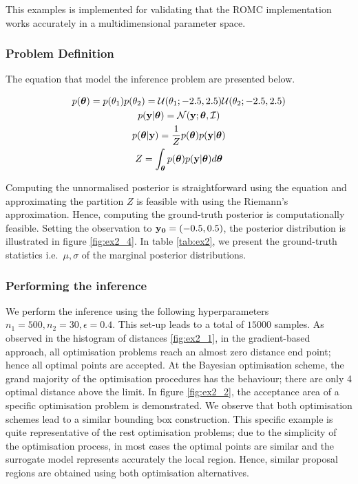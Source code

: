 This examples is implemented for validating that the ROMC
implementation works accurately in a multidimensional parameter
space.

\subsubsection*{Problem Definition}

The equation that model the inference problem are presented below.

\begin{gather}
  p(\boldsymbol{\theta}) = p(\theta_1)p(\theta_2)
  = \mathcal{U}(\theta_1; -2.5, 2.5) \mathcal{U}(\theta_2; -2.5, 2.5)\\
  p(\mathbf{y}|\boldsymbol{\theta}) = \mathcal{N}(\mathbf{y};\boldsymbol{\theta}, \mathcal{I})\\
  p(\boldsymbol{\theta}|\mathbf{y}) = \frac{1}{Z}p(\boldsymbol{\theta})p(\mathbf{y}|\boldsymbol{\theta})\\
  Z = \int_{\boldsymbol{\theta}} p(\boldsymbol{\theta})p(\mathbf{y}|\boldsymbol{\theta}) d\boldsymbol{\theta}
\end{gather}

Computing the unnormalised posterior is straightforward using the
equation and approximating the partition $Z$ is feasible with using
the Riemann's approximation. Hence, computing the ground-truth
posterior is computationally feasible. Setting the observation to
$\mathbf{y_0}=(-0.5,0.5)$, the posterior distribution is illustrated in
figure \ref{fig:ex2_4}. In table \ref{tab:ex2}, we present the
ground-truth statistics i.e.\ $\mu, \sigma$ of the marginal
posterior distributions.

\subsubsection*{Performing the inference}

We perform the inference using the following hyperparameters
$n_1=500, n_2=30, \epsilon=0.4$. This set-up leads to a total of
$15000$ samples. As observed in the histogram of distances
\ref{fig:ex2_1}, in the gradient-based approach, all optimisation
problems reach an almost zero distance end point; hence all optimal
points are accepted. At the Bayesian optimisation scheme, the grand
majority of the optimisation procedures has the behaviour; there are
only 4 optimal distance above the limit. In figure \ref{fig:ex2_2},
the acceptance area of a specific optimisation problem is
demonstrated. We observe that both optimisation schemes lead to a
similar bounding box construction. This specific example is quite
representative of the rest optimisation problems; due to the
simplicity of the optimisation process, in most cases the optimal
points are similar and the surrogate model represents accurately the
local region. Hence, similar proposal regions are obtained using both
optimisation alternatives.

